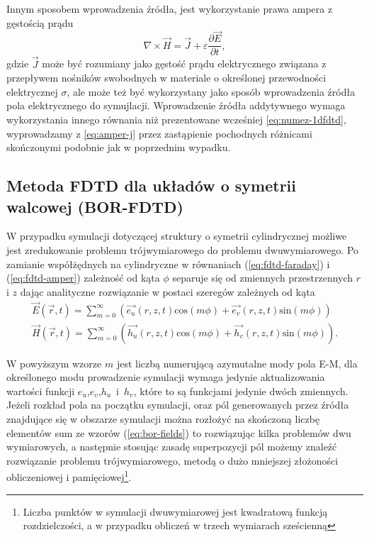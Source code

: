Innym sposobem wprowadzenia źródła, jest wykorzystanie prawa ampera z gęstością prądu
\begin{equation}
\nabla \times \vec{H} = \vec{J} + \varepsilon \frac{\partial \vec{E}}{\partial t},
\label{eq:amper-j}
\end{equation}
gdzie $\vec{J}$ może być rozumiany jako gęstość prądu elektrycznego związana z przepływem nośników swobodnych w materiale o określonej przewodności elektrycznej $\sigma$, ale może też być wykorzystany jako sposób wprowadzenia źródła pola elektrycznego do symujlacji. Wprowadzenie źródła addytywnego wymaga wykorzystania innego równania niż prezentowane wcześniej \ref{eq:numez-1dfdtd}, wyprowadzamy z \ref{eq:amper-j} przez zastąpienie pochodnych różnicami skończonymi podobnie jak w poprzednim wypadku. 



\subsection{Metoda FDTD dla układów o symetrii walcowej (BOR-FDTD)}
\label{subart:borfdtd}
W przypadku symulacji dotyczącej struktury o symetrii cylindrycznej możliwe jest zredukowanie problemu trójwymiarowego do problemu dwuwymiarowego. Po zamianie współżędnych na cylindryczne w równaniach (\ref{eq:fdtd-faraday}) i (\ref{eq:fdtd-amper}) zależność od kąta $\phi$ separuje się od zmiennych przestrzennych $r$ i $z$ dając analityczne rozwiązanie w postaci szeregów zależnych od kąta
\begin{equation}
	\begin{gathered}
	\vec{E}(\vec{r},t)=\sum_{m=0}^{\infty}(\vec{e_u}(r,z,t) \textrm{cos}(m\phi)+\vec{e_v}(r,z,t)\textrm{sin}(m\phi)) \\
	\vec{H}(\vec{r},t)=\sum_{m=0}^{\infty}(\vec{h_u}(r,z,t) \textrm{cos}(m\phi)+\vec{h_v}(r,z,t)\textrm{sin}(m\phi)).
	\end{gathered}
	\label{eq:bor-fields}
\end{equation}

W powyższym wzorze $m$ jest liczbą numerującą azymutalne mody pola E-M, dla określonego modu prowadzenie symulacji wymaga jedynie aktualizowania wartości funkcji $e_u$,$e_v$,$h_u$~i~$h_v$, które to są funkcjami jedynie dwóch zmiennych. Jeżeli rozkład pola na początku symulacji, oraz pól generowanych przez źródła znajdujące się w obszarze symulacji można rozłożyć na skończoną liczbę elementów sum ze wzorów (\ref{eq:bor-fields}) to rozwiązując kilka problemów dwu wymiarowych, a następnie stosując zasadę superpozycji pól możemy znaleźć rozwiązanie problemu trójwymiarowego, metodą o dużo mniejszej złożoności obliczeniowej i pamięciowej\footnote{Liczba punktów w symulacji dwuwymiarowej jest kwadratową funkcją rozdzielczości, a w przypadku obliczeń w trzech wymiarach sześcienną}.

